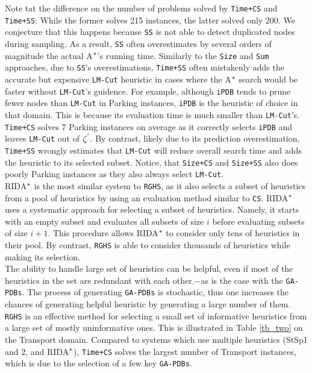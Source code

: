 Note tat the difference on the number of problems solved by \texttt{Time+CS} and \texttt{Time+SS}: While the former solves 215 instances, the latter solved only 200. We conjecture that this happens because \texttt{SS} is not able to detect duplicated nodes during sampling. As a result, \texttt{SS} often overestimates by several orders of magnitude the actual A$\sp{*}$'s running time. Similarly to the \texttt{Size} and \texttt{Sum} approaches, due to \texttt{SS}'s overestimations, \texttt{Time+SS} often mistakenly adds the accurate but expensive \texttt{LM-Cut} heuristic in cases where the A$\sp{*}$ search would be faster without \texttt{LM-Cut}'s guidence. For example, although \texttt{iPDB} tends to prune fewer nodes than \texttt{LM-Cut} in Parking instances, \texttt{iPDB} is the heuristic of choice in that domain. This is because its evaluation time is much smaller than \texttt{LM-Cut}'s. \texttt{Time+CS} solves 7 Parking instances on average as it correctly selects \texttt{iPDB} and leaves \texttt{LM-Cut} out of $\zeta\sp{'}$. By contrast, likely due to its prediction overestimation, \texttt{Time+SS} wrongly estimates that \texttt{LM-Cut} will reduce overall search time and adds the heuristic to its selected subset. Notice, that \texttt{Size+CS} and \texttt{Size+SS} also does poorly Parking instances as they also always select \texttt{LM-Cut}.\\

RIDA$\sp{*}$ is the most similar system to \texttt{RGHS}, as it also selects a subset of heuristics from a pool of heuristics by using an evaluation method similar to \texttt{CS}. RIDA$\sp{*}$ uses a systematic approach for selecting a subset of heuristics. Namely, it starts with an empty subset and evaluates all subsets of size $i$ before evaluating subsets of size $i+1$. This procedure allows RIDA$\sp{*}$ to consider only tens of heuristics in their pool. By contrast, \texttt{RGHS} is able to consider thousands of heuristics while making its selection.\\

The ability to handle large set of heuristics can be helpful, even if most of the heuristics in the set are redundant with each other.$-$as is the case with the \texttt{GA-PDBs}. The process of generating \texttt{GA-PDBs} is stochastic, thus one increases the chances of generating helpful heuristic by generating a large number of them. \texttt{RGHS} is an effective method for selecting a small set of informative heuristics from a large set of mostly uninformative ones. This is illustrated in Table \ref{tb_two} on the Transport domain. Compared to systems which use multiple heuristics (StSp1 and 2, and RIDA$\sp{*}$), \texttt{Time+CS} solves the largest number of Transport instances, which is due to the selection of a few key \texttt{GA-PDBs}.\\

